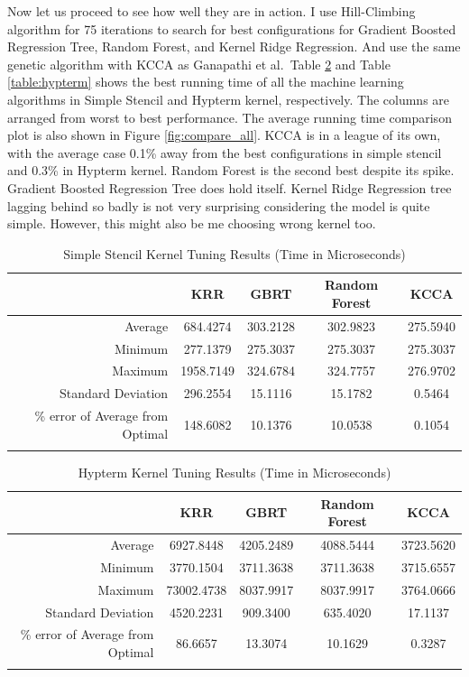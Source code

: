 Now let us proceed to see how well they are in action. I use Hill-Climbing algorithm for 75 iterations to search for best configurations for Gradient Boosted Regression Tree, Random Forest, and Kernel Ridge Regression. And use the same genetic algorithm with KCCA as Ganapathi et al.\ Table \ref{table:simple} and Table \ref{table:hypterm} shows the best running time of all the machine learning algorithms in Simple Stencil and Hypterm kernel, respectively. The columns are arranged from worst to best performance. The average running time comparison plot is also shown in Figure \ref{fig:compare_all}. KCCA is in a league of its own, with the average case 0.1\% away from the best configurations in simple stencil and 0.3\% in Hypterm kernel. Random Forest is the second best despite its spike. Gradient Boosted Regression Tree does hold itself. Kernel Ridge Regression tree lagging behind so badly is not very surprising considering the model is quite simple. However, this might also be me choosing wrong kernel too.

\begin{table}[ht]
\caption{Simple Stencil Kernel Tuning Results (Time in Microseconds)}
\center
\begin{tabular}{r c c c c}
\hline
 & KRR	& GBRT	& Random Forest	& KCCA \\
\hline\hline
Average	& 684.4274	& 303.2128	& 302.9823	& 275.5940 \\
Minimum	& 277.1379	& 275.3037	& 275.3037	& 275.3037 \\
Maximum	& 1958.7149	& 324.6784	& 324.7757	& 276.9702 \\
Standard Deviation	& 296.2554	& 15.1116	& 15.1782	& 0.5464 \\
\% error of Average from Optimal	& 148.6082	& 10.1376	& 10.0538	& 0.1054 \\
\hline
\label{tbl:simple}
\end{tabular}
\label{table:simple}
\end{table}

\begin{table}[ht]
\caption{Hypterm Kernel Tuning Results (Time in Microseconds)}
\center
\begin{tabular}{r c c c c}
\hline
 & KRR	& GBRT	& Random Forest	& KCCA \\
\hline\hline
Average	& 6927.8448	& 4205.2489	& 4088.5444	& 3723.5620 \\
Minimum	& 3770.1504	& 3711.3638	& 3711.3638	& 3715.6557 \\
Maximum	& 73002.4738	& 8037.9917	& 8037.9917	& 3764.0666 \\
Standard Deviation	& 4520.2231	& 909.3400	& 635.4020	& 17.1137 \\
\% error of Average from Optimal	& 86.6657	& 13.3074	& 10.1629	& 0.3287 \\
\hline
\label{tbl:hypterm}
\end{tabular}
\label{table:simple}
\end{table}

